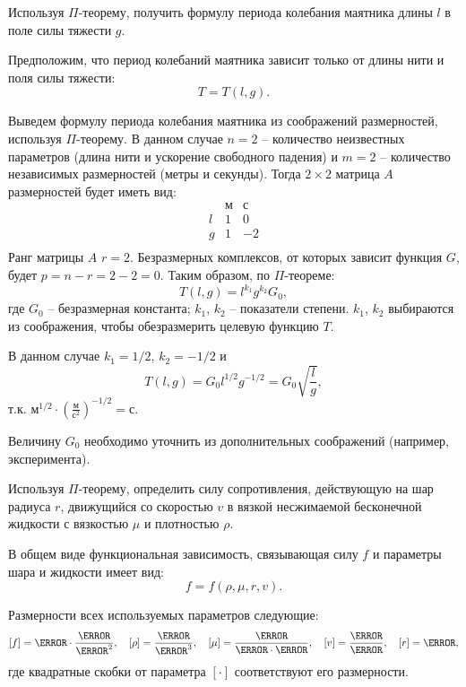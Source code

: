 \documentclass[14pt]{extarticle}
\begin{document}
\begin{problem}
Используя $\Pi$-теорему, получить формулу периода колебания маятника длины $l$ в поле силы тяжести $g$.
\end{problem}

Предположим, что период колебаний маятника зависит только от длины нити и поля силы тяжести:
\[
T=T(l,g).
\]

Выведем формулу периода колебания маятника из соображений размерностей, используя $\Pi$-теорему. В данном случае $n=2$ -- количество неизвестных параметров (длина нити и ускорение свободного падения) и $m=2$ -- количество независимых размерностей (метры и секунды). Тогда $2 \times 2$ матрица $A$ размерностей будет иметь вид:
\[
\begin{array}{c||c|c}
& \text{м} &  \text{с} \\
\hline
\hline
l & 1 & 0 \\
\hline
g & 1 & -2 \\
\end{array}
\]
Ранг матрицы $A$  $r=2$. Безразмерных комплексов, от которых зависит функция $G$, будет $p=n-r=2-2=0$. Таким образом, по $\Pi$-теореме:
\[
T(l,g) =  l^{k_1} g^{k_2} G_0,
\]
где $G_0$ -- безразмерная константа; $k_1$, $k_2$ -- показатели степени.
$k_1$, $k_2$ выбираются из соображения, чтобы обезразмерить целевую функцию $T$. 

В данном случае $k_1 = 1/2$, $k_2 = -1/2$ и 
\[
T(l,g) = G_0 l^{1/2} g^{-1/2}= G_0  \sqrt{\frac{l}{g}},
\]
т.к. $\text{м}^{1/2} \cdot \left(\displaystyle\frac{\text{м}}{\text{с}^2}\right)^{-1/2} = \text{с}$.

Величину $G_0$ необходимо уточнить из дополнительных соображений (например, эксперимента).

\begin{problem}
	Используя  $\Pi$-теорему, определить силу сопротивления, действующую на шар радиуса $r$, движущийся со скоростью $v$ в вязкой  несжимаемой бесконечной жидкости с вязкостью $\mu$ и плотностью $\rho$. 
\end{problem}

В общем виде функциональная зависимость, связывающая силу $f$ и параметры шара и жидкости имеет вид:
\begin{equation}
	\label{eq:problem_f_dependency}
	f = f(\rho, \mu, r, v).
\end{equation}

Размерности \alert{всех} используемых параметров следующие:
\[
[f] = \kg \cdot \frac{\m}{\s^2},\quad
[\rho] = \frac{\kg}{\m^3},\quad
[\mu] = \frac{\kg}{\m \cdot \s},\quad
[v]  = \frac{\m}{\s},\quad
[r] = \m,
\]
где квадратные скобки от параметра $[\cdot]$ соответствуют его размерности.
\end{document}
